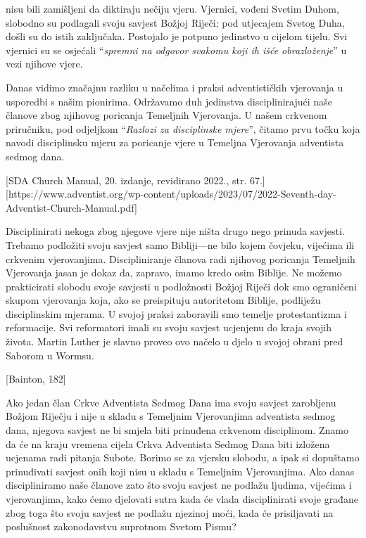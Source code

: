  nisu bili zamišljeni da diktiraju nečiju vjeru. Vjernici, vođeni Svetim Duhom, slobodno su podlagali svoju savjest Božjoj Riječi; pod utjecajem Svetog Duha, došli su do istih zaključaka. Postojalo je potpuno jedinstvo u cijelom tijelu. Svi vjernici su se osjećali “\textit{spremni na odgovor svakomu koji ih išće obrazloženje}” u vezi njihove vjere.

Danas vidimo značajnu razliku u načelima i praksi adventističkih vjerovanja u usporedbi s našim pionirima. Održavamo duh jedinstva disciplinirajući naše članove zbog njihovog poricanja Temeljnih Vjerovanja. U našem crkvenom priručniku, pod odjeljkom “\textit{Razlozi za disciplinske mjere}”, čitamo prvu točku koja navodi disciplinsku mjeru za poricanje vjere u Temeljna Vjerovanja adventista sedmog dana.


[SDA Church Manual, 20. izdanje, revidirano 2022., str. 67.][https://www.adventist.org/wp-content/uploads/2023/07/2022-Seventh-day-Adventist-Church-Manual.pdf]

Disciplinirati nekoga zbog njegove vjere nije ništa drugo nego prinuda savjesti. Trebamo podložiti svoju savjest samo Bibliji—ne bilo kojem čovjeku, vijećima ili crkvenim vjerovanjima. Discipliniranje članova radi njihovog poricanja Temeljnih Vjerovanja jasan je dokaz da, zapravo, imamo kredo osim Biblije. Ne možemo prakticirati slobodu svoje savjesti u podložnosti Božjoj Riječi dok smo ograničeni skupom vjerovanja koja, ako se preispituju autoritetom Biblije, podliježu disciplinskim mjerama. U svojoj praksi zaboravili smo temelje protestantizma i reformacije. Svi reformatori imali su svoju savjest ucjenjenu do kraja svojih života. Martin Luther je slavno proveo ovo načelo u djelo u svojoj obrani pred Saborom u Wormsu.

[Bainton, 182]

Ako jedan član Crkve Adventista Sedmog Dana ima svoju savjest zarobljenu Božjom Riječju i nije u skladu s Temeljnim Vjerovanjima adventista sedmog dana, njegova savjest ne bi smjela biti prinuđena crkvenom disciplinom. Znamo da će na kraju vremena cijela Crkva Adventista Sedmog Dana biti izložena ucjenama radi pitanja Subote. Borimo se za vjersku slobodu, a ipak si dopuštamo prinuđivati savjest onih koji nisu u skladu s Temeljnim Vjerovanjima. Ako danas discipliniramo naše članove zato što svoju savjest ne podlažu ljudima, vijećima i vjerovanjima, kako ćemo djelovati sutra kada će vlada disciplinirati svoje građane zbog toga što svoju savjest ne podlažu njezinoj moći, kada će prisiljavati na poslušnost zakonodavstvu suprotnom Svetom Pismu?

